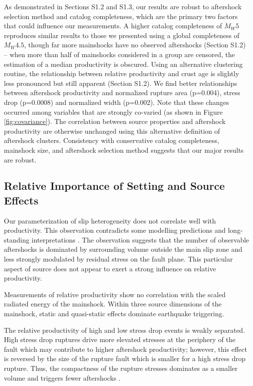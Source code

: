 \documentclass[draft, jgrga]{agujournal2018}
\begin{document}
As demonstrated in Sections S1.2 and S1.3, our results are robust to aftershock selection method and catalog completeness, which are the primary two factors that could influence our measurements. A higher catalog completeness of $M_W5$ reproduces similar results to those we presented using a global completeness of $M_W4.5$, though far more mainshocks have no observed aftershocks (Section S1.2) -- when more than half of mainshocks considered in a group are censored, the estimation of a median productivity is obscured. Using an alternative clustering routine, the relationship between relative productivity and crust age is slightly less pronounced but still apparent (Section S1.2). We find better relationships between aftershock productivity and normalized rupture area (p=0.004), stress drop (p=0.0008) and normalized width (p=0.002). Note that these changes occurred among variables that are strongly co-varied (as shown in Figure \ref{fig:covariance}). The correlation between source properties and aftershock productivity are otherwise unchanged using this alternative definition of aftershock clusters. Consistency with conservative catalog completeness, mainshock size, and aftershock selection method suggests that our major results are robust.

\subsection{Relative Importance of Setting and Source Effects}

Our parameterization of slip heterogeneity does not correlate well with productivity. This observation contradicts some modelling predictions \citep{Helmstetter2006RelationModel, Marsan2006} and long-standing interpretations \citep[e.g.][]{Mogi1967}. The observation suggests that the number of observable aftershocks is dominated by surrounding volume outside the main slip zone and less strongly modulated by residual stress on the fault plane. This particular aspect of source does not appear to exert a strong influence on relative productivity.

Measurements of relative productivity show no correlation with the scaled radiated energy of the mainshock. Within three source dimensions of the mainshock, static and quasi-static effects dominate earthquake triggering.

The relative productivity of high and low stress drop events is weakly separated. High stress drop ruptures drive more elevated stresses at the periphery of the fault which may contribute to higher aftershock productivity; however, this effect is reversed by the size of the rupture fault which is smaller for a high stress drop rupture. Thus, the compactness of the rupture stresses dominates as a smaller volume and triggers fewer aftershocks \citep{Wetzler2016}.
\end{document}

